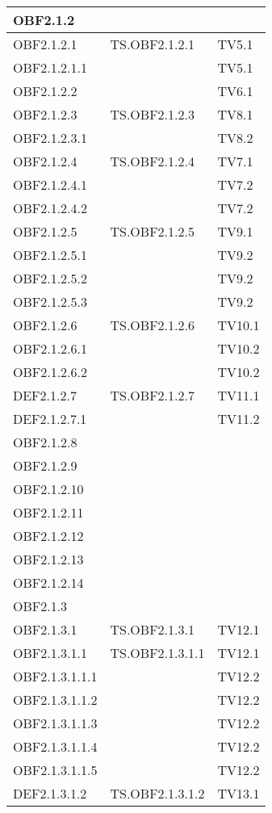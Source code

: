 \documentclass{scalatekids-article}
\begin{document}
\begin{longtable}[H]{|l|p{4cm}|p{4cm}|}
  \hline
  OBF2.1.2 & & \\
  \hline
  OBF2.1.2.1 & TS.OBF2.1.2.1 & TV5.1\\
  \hline
  OBF2.1.2.1.1 & & TV5.1\\
  \hline
  OBF2.1.2.2 & & TV6.1\\
  \hline
  OBF2.1.2.3 & TS.OBF2.1.2.3 & TV8.1\\
  \hline
  OBF2.1.2.3.1 & & TV8.2\\
  \hline
  OBF2.1.2.4 & TS.OBF2.1.2.4 & TV7.1\\
  \hline
  OBF2.1.2.4.1 & & TV7.2\\
  \hline
  OBF2.1.2.4.2 & & TV7.2\\
  \hline
  OBF2.1.2.5 & TS.OBF2.1.2.5 & TV9.1\\
  \hline
  OBF2.1.2.5.1 & & TV9.2\\
  \hline
  OBF2.1.2.5.2 & & TV9.2\\
  \hline
  OBF2.1.2.5.3 & & TV9.2\\
  \hline
  OBF2.1.2.6 & TS.OBF2.1.2.6 & TV10.1\\
  \hline
  OBF2.1.2.6.1 & & TV10.2\\
  \hline
  OBF2.1.2.6.2 & & TV10.2\\
  \hline
  DEF2.1.2.7 & TS.OBF2.1.2.7 & TV11.1\\
  \hline
  DEF2.1.2.7.1 & & TV11.2\\
  \hline
  OBF2.1.2.8 &  &\\
  \hline
  OBF2.1.2.9 &  &\\
  \hline
  OBF2.1.2.10 &  &\\
  \hline
  OBF2.1.2.11 &  &\\
  \hline
  OBF2.1.2.12 &  &\\
  \hline
  OBF2.1.2.13 &  &\\
  \hline
  OBF2.1.2.14 &  &\\
  \hline
  OBF2.1.3 &  &\\
  \hline
  OBF2.1.3.1 & TS.OBF2.1.3.1 & TV12.1\\
  \hline
  OBF2.1.3.1.1 & TS.OBF2.1.3.1.1 & TV12.1\\
  \hline
  OBF2.1.3.1.1.1 & & TV12.2\\
  \hline
  OBF2.1.3.1.1.2 & & TV12.2\\
  \hline
  OBF2.1.3.1.1.3 & & TV12.2\\
  \hline
  OBF2.1.3.1.1.4 & & TV12.2\\
  \hline
  OBF2.1.3.1.1.5 & & TV12.2\\
  \hline
  DEF2.1.3.1.2 & TS.OBF2.1.3.1.2 & TV13.1\\

\end{longtable}
\end{document}
